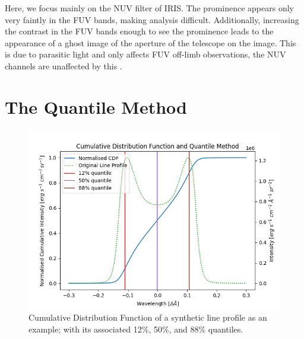 
Here, we focus mainly on the NUV filter of IRIS. The prominence appears only very faintly in the FUV bands, making analysis difficult. Additionally, increasing the contrast in the FUV bands enough to see the prominence leads to the appearance of a ghost image of the aperture of the telescope on the image. This is due to parasitic light and only affects FUV off-limb observations, the NUV channels are unaffected by this \citep{wulser_instrument_2018}.
\section{The Quantile Method}
\label{quantile_method}
\begin{figure}
    \centering
    \includegraphics[width=.9\linewidth]{./01Observations/figs/20180419/cdf.png}
    \caption{Cumulative Distribution Function of a synthetic line profile as an example; with its associated 12\%, 50\%, and 88\% quantiles.}
    \label{cdfex}
\end{figure}

